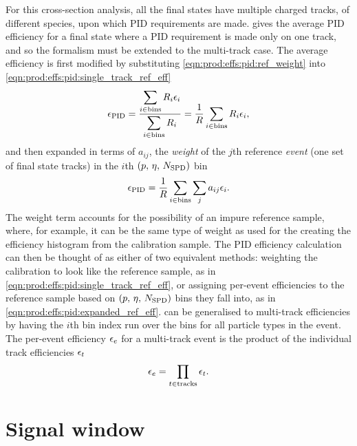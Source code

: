 For this cross-section analysis, all the final states have multiple charged 
tracks, of different species, upon which \ac{PID} requirements are made.
 gives the average \ac{PID} 
efficiency for a final state where a \ac{PID} requirement is made only on one 
track, and so the formalism must be extended to the multi-track case.
The average efficiency is first modified by substituting 
\cref{eqn:prod:effs:pid:ref_weight} into 
\cref{eqn:prod:effs:pid:single_track_ref_eff}
\begin{equation}
  \effpid = \frac{%
    \displaystyle\sum_{i \in \textnormal{bins}} R_{i}\eff_{i}
  }{%
    \displaystyle\sum_{i \in \textnormal{bins}} R_{i}
  }
  = \frac{1}{R}\sum_{i \in \textnormal{bins}} R_{i}\eff_{i},
\end{equation}
and then expanded in terms of $a_{ij}$, the \emph{weight} of the $j$th 
reference \emph{event} (one set of final state tracks) in the $i$th 
$(p,\,\eta,\,N_{\textnormal{SPD}})$ bin
\begin{equation}
  \epsilon_{\textnormal{PID}} = \frac{1}{R}
            \sum_{i \in \textnormal{bins}}\sum_{j} a_{ij}\epsilon_{i}.
  \label{eqn:prod:effs:pid:expanded_ref_eff}
\end{equation}
The weight term accounts for the possibility of an impure reference sample, 
where, for example, it can be the same type of weight as used for the creating 
the efficiency histogram from the calibration sample.
The \ac{PID} efficiency calculation can then be thought of as either of two 
equivalent methods: weighting the calibration to look like the reference 
sample, as in \cref{eqn:prod:effs:pid:single_track_ref_eff}, or assigning 
per-event efficiencies to the reference sample based on 
$(p,\,\eta,\,N_{\textnormal{SPD}})$ bins they fall into, as in 
\cref{eqn:prod:effs:pid:expanded_ref_eff}.
 can be generalised to multi-track 
efficiencies by having the $i$th bin index run over the bins for all particle 
types in the event.
The per-event efficiency $\epsilon_{e}$ for a multi-track event is the product of 
the individual track efficiencies $\epsilon_{t}$
\begin{equation}
  \epsilon_{e} = \prod_{t \in \textnormal{tracks}} \epsilon_{t}.
\end{equation}

\section{Signal window}
\label{chap:prod:effs:signal_window}

